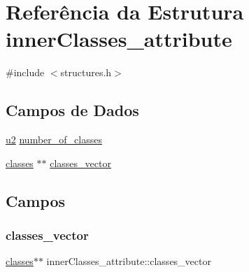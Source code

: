 \hypertarget{structinnerClasses__attribute}{}\section{Referência da Estrutura inner\+Classes\+\_\+attribute}
\label{structinnerClasses__attribute}


{\ttfamily \#include $<$structures.\+h$>$}

\subsection*{Campos de Dados}
\begin{DoxyCompactItemize}
\item 
\hyperlink{lista__operandos_8h_a732cde1300aafb73b0ea6c2558a7a54f}{u2} \hyperlink{structinnerClasses__attribute_a5025605be4999db69f5cf0309fa1e443}{number\+\_\+of\+\_\+classes}
\item 
\hyperlink{structclasses}{classes} $\ast$$\ast$ \hyperlink{structinnerClasses__attribute_a0179ecaaf1ae3febfc8553dcfb278679}{classes\+\_\+vector}
\end{DoxyCompactItemize}


\subsection{Campos}
\mbox{\label{structinnerClasses__attribute_a0179ecaaf1ae3febfc8553dcfb278679}} 
\subsubsection{\texorpdfstring{classes\+\_\+vector}{classes\_vector}}
{\footnotesize\ttfamily \hyperlink{structclasses}{classes}$\ast$$\ast$ inner\+Classes\+\_\+attribute\+::classes\+\_\+vector}

\mbox{\label{structinnerClasses__attribute_a5025605be4999db69f5cf0309fa1e443}} 
